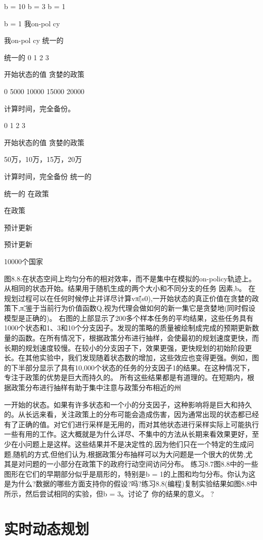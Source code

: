 b = 10 b = 3
b = 1

b = 1
我on-pol cy

我on-pol cy
统一的

统一的
0 1 2 3


开始状态的值
贪婪的政策

0 5000 10000 15000 20000

计算时间，完全备份。

0 1 2 3

开始状态的值
贪婪的政策

50万，10万，15万，20万

计算时间，完全备份
统一的

统一的
在政策

在政策

预计更新

预计更新

10000个国家


图8.8:在状态空间上均匀分布的相对效率，而不是集中在模拟的on-policy轨迹上。
从相同的状态开始。结果用于随机生成的两个大小和不同分支的任务
因素,b。
在规划过程可以在任何时候停止并详尽计算vπ̃(s0),一开始状态的真正价值在贪婪的政策下,π̃,鉴于当前行为价值函数Q,视为代理会做如何的新一集它是贪婪地(同时假设模型是正确的)。
右图的上部显示了200多个样本任务的平均结果，这些任务具有1000个状态和1、3和10个分支因子。发现的策略的质量被绘制成完成的预期更新数量的函数。在所有情况下，根据政策分布进行抽样，会使最初的规划速度更快，而长期的规划速度较慢。在较小的分支因子下，效果更强，更快规划的初始阶段更长。在其他实验中，我们发现随着状态数的增加，这些效应也变得更强。例如，图的下半部分显示了具有10,000个状态的任务的分支因子1的结果。在这种情况下，专注于政策的优势是巨大而持久的。
所有这些结果都是有道理的。在短期内，根据政策分布进行抽样有助于集中注意与政策分布相近的州


一开始的状态。如果有许多状态和一个小的分支因子，这种影响将是巨大和持久的。从长远来看，关注政策上的分布可能会造成伤害，因为通常出现的状态都已经有了正确的值。对它们进行采样是无用的，而对其他状态进行采样实际上可能执行一些有用的工作。这大概就是为什么详尽、不集中的方法从长期来看效果更好，至少在小问题上是这样。这些结果并不是决定性的,因为他们只在一个特定的生成问题,随机的方式,但他们认为,根据政策分布抽样可以为大问题是一个很大的优势,尤其是对问题的一小部分在政策下的政府行动空间访问分布。
练习8.7图8.8中的一些图形在它们的早期部分似乎是扇形的，特别是b = 1的上图和均匀分布。你认为这是为什么?数据的哪些方面支持你的假设?吗?练习8.8(编程)复制实验结果如图8.8中所示，然后尝试相同的实验，但b = 3。讨论了
你的结果的意义。 					?


\section{实时动态规划}

